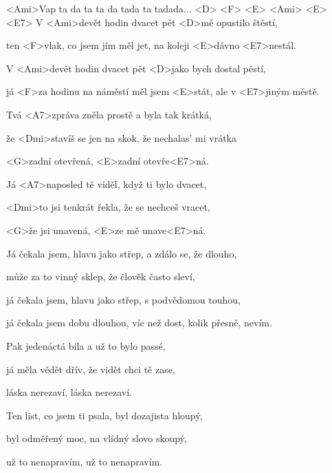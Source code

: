 

\zr
<Ami>Vap ta da ta ta da tada ta tadada... <D> <F> <E> <Ami> <E> <E7>
\kr
\zs
V <Ami>devět hodin dvacet pět <D>mě opustilo štěstí,

ten <F>vlak, co jsem jím měl jet, na koleji <E>dávno <E7>nestál.

V <Ami>devět hodin dvacet pět <D>jako bych dostal pěstí,

já <F>za hodinu na náměstí měl jsem <E>stát,
ale v <E7>jiným městě.


Tvá <A7>zpráva zněla prostě a byla tak krátká,

že <Dmi>stavíš se jen na skok, že nechalas' mi vrátka

<G>zadní otevřená, <E>zadní otevře<E7>ná.



Já <A7>naposled tě viděl, když ti bylo dvacet,

<Dmi>to jsi tenkrát řekla, že se nechceš vracet,

<G>že jsi unavená, <E>ze mě unave<E7>ná.
\ks

\zr \kr

\zs
Já čekala jsem, hlavu jako střep, a zdálo se, že dlouho,

může za to vinný sklep, že člověk často sleví,

já čekala jsem, hlavu jako střep, s podvědomou touhou,

já čekala jsem dobu dlouhou, víc než dost, kolik přesně, nevím.



Pak jedenáctá bila a už to bylo passé,

já měla vědět dřív, že vidět chci tě zase,

láska nerezaví, láska nerezaví.



Ten list, co jsem ti psala, byl dozajista hloupý,

byl odměřený moc, na vlídný slovo skoupý,

už to nenapravím, už to nenapravím.
\ks
\zr \kr
\kp

